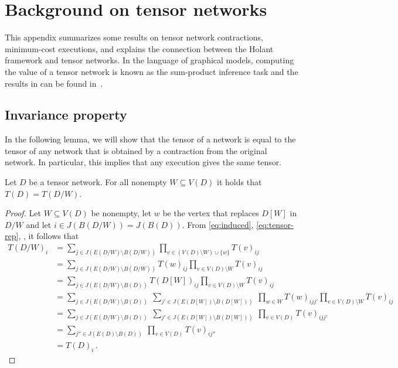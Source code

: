 \documentclass{toc}
\begin{document}
%

\appendix


\section{Background on tensor networks}

\label{sect:exec}

This appendix summarizes some results on tensor network contractions, minimum-cost executions, and explains the connection between the Holant framework and tensor networks.   In the language of graphical models, computing the value of a tensor network is known as the sum-product inference task and the results in   can be found in~\cite[Part II]{KollerF2009}.

\subsection{Invariance property} \label{sec:invariance_property}

In the following lemma, we will show that the tensor of a network is equal to the tensor of any network that is obtained by a contraction from the original network. In particular, this implies that any execution gives the same tensor.

\begin{lemma}[Invariance]
\label{lem:invariance}
Let $D$ be a tensor network. For all nonempty $W\subseteq V(D)$ it holds that $T(D)=T(D/W)$.
\end{lemma}
\begin{proof}
Let $W\subseteq V(D)$ be nonempty, let $w$ be the vertex that replaces $D[W]$ in  $D/W$ and let $i\in J(B(D/W))=J(B(D))$.
From \eqref{eq:induced}, \eqref{eq:tensor-rep}, ,
it follows that
\[
\begin{split}
T(D/W)_i
&=
\sum_{j\in J(E(D/W)\setminus B(D/W))}
\prod_{v\in (V(D)\setminus W) \cup \{w\}}T(v)_{ij}\\
&=
\sum_{j\in J(E(D/W)\setminus B(D/W))}
T(w)_{ij}\prod_{v\in V(D)\setminus W}T(v)_{ij}\\
&=
\sum_{j\in J(E(D/W)\setminus B(D))}
T(D[W])_{ij}\prod_{v\in V(D)\setminus W}T(v)_{ij}\\
&=
\sum_{j\in J(E(D/W)\setminus B(D))}\
\sum_{j'\in J(E(D[W])\setminus B(D[W]))}\
\prod_{w\in W}T(w)_{ijj'}
\prod_{v\in V(D)\setminus W}T(v)_{ij}\\
&=
\sum_{j\in J(E(D/W)\setminus B(D))}\
\sum_{j'\in J(E(D[W])\setminus B(D[W]))}\
\prod_{v\in V(D)}T(v)_{ijj'}\\
&=
\sum_{j''\in J(E(D)\setminus B(D))}\
\prod_{v\in V(D)}T(v)_{ij''}\\
&=T(D)_i\,.
\end{split}
\]
\end{proof}
\end{document}
